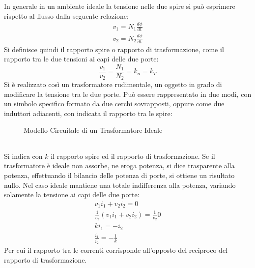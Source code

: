\documentclass{article}
\numberwithin{equation}{subsection}
\begin{document}
In generale in un ambiente ideale la tensione nelle due spire si può esprimere rispetto al flusso dalla seguente relazione:
\begin{gather*}
    v_1=\displaystyle N_1\frac{d\phi}{dt}\\
    v_2=\displaystyle N_2\frac{d\phi}{dt}
\end{gather*}
Si definisce quindi il rapporto spire o rapporto di trasformazione, come il rapporto tra le due tensioni ai capi delle due porte:
\begin{equation}
    \displaystyle\frac{v_1}{v_2}=\frac{N_1}{N_2}=k_n=k_T
\end{equation}
Si è realizzato così un trasformatore rudimentale, un oggetto in grado di modificare la tensione tra le due porte. Può essere rappresentato in due modi, con un simbolo 
specifico formato da due cerchi sovrapposti, oppure come due induttori adiacenti, con indicata il rapporto tra le spire:
\begin{figure}[ht]%
    \centering
    \qquad
    \caption{Modello Circuitale di un Trasformatore Ideale}
    \label{fig:trasformatore-ideale}
\end{figure}
\\
Si indica con $k$ il rapporto spire ed il rapporto di trasformazione. Se il trasformatore è ideale non assorbe, ne eroga potenza, si dice trasparente alla potenza, effettuando 
il bilancio delle potenza di porte, si ottiene un risultato nullo. Nel caso ideale mantiene una totale indifferenza alla potenza, variando solamente la tensione ai capi delle 
due porte:
\begin{gather*}
    v_1i_1+v_2i_2=0\\
    \displaystyle\frac{1}{v_2}\left(v_1i_1+v_2i_2\right)=\frac{1}{v_2}0\\
    ki_1=-i_2\\
    \displaystyle\frac{i_1}{i_2}=-\frac{1}{k}
\end{gather*}
Per cui il rapporto tra le correnti corrisponde all'opposto del reciproco del rapporto di trasformazione. 
\end{document}

